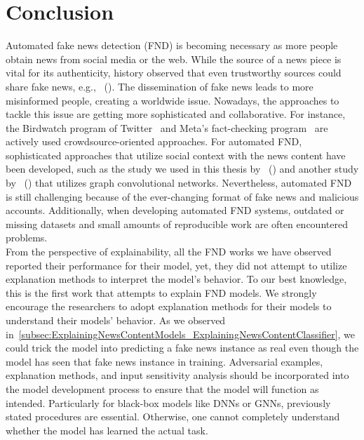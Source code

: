 
\chapter{Conclusion}\label{chapter:conclusion}
Automated fake news detection (FND) is becoming necessary as more people obtain news from social media or the web. While the source of a news piece is vital for its authenticity, history observed that even trustworthy sources could share fake news, e.g.,~\citeauthor{TheGreatMoonHoax_Foster} (\citeyear{TheGreatMoonHoax_Foster}). The dissemination of fake news leads to more misinformed people, creating a worldwide issue. Nowadays, the approaches to tackle this issue are getting more sophisticated and collaborative. For instance, the Birdwatch program of Twitter~\parencite{BirdwatchOverview_Twitter} and Meta's fact-checking program~\parencite{MetaFactCheckingProgram_Meta} are actively used crowdsource-oriented approaches. For automated FND, sophisticated approaches that utilize social context with the news content have been developed, such as the study we used in this thesis by~\citeauthor{UPFD_Dataset_Shu} (\citeyear{UPFD_Dataset_Shu}) and another study by~\citeauthor{FakeNewsDetectionUsingGeometricDeepLearning_Monti} (\citeyear{FakeNewsDetectionUsingGeometricDeepLearning_Monti}) that utilizes graph convolutional networks. Nevertheless, automated FND is still challenging because of the ever-changing format of fake news and malicious accounts. Additionally, when developing automated FND systems, outdated or missing datasets and small amounts of reproducible work are often encountered problems.\\
From the perspective of explainability, all the FND works we have observed reported their performance for their model, yet, they did not attempt to utilize explanation methods to interpret the model's behavior. To our best knowledge, this is the first work that attempts to explain FND models. We strongly encourage the researchers to adopt explanation methods for their models to understand their models' behavior. As we observed in~\ref{subsec:ExplainingNewsContentModels_ExplainingNewsContentClassifier}, we could trick the model into predicting a fake news instance as real even though the model has seen that fake news instance in training. Adversarial examples, explanation methods, and input sensitivity analysis should be incorporated into the model development process to ensure that the model will function as intended. Particularly for black-box models like DNNs or GNNs, previously stated procedures are essential. Otherwise, one cannot completely understand whether the model has learned the actual task.\\
